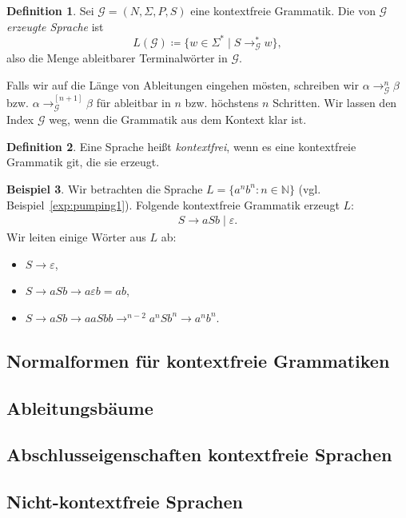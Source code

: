 \documentclass[11pt, a4paper]{article}
\theoremstyle{definition}
\newtheorem{definition}{Definition}[section]
\newtheorem{example}[definition]{Beispiel}
\theoremstyle{plain}
\numberwithin{equation}{section}
\begin{document}
\begin{definition}
	Sei $\mathcal{G} = (N, \Sigma, P, S)$ eine kontextfreie Grammatik. Die von $\mathcal{G}$ \textit{erzeugte Sprache} ist
	$$
		L(\mathcal{G}) \coloneqq \{w \in \Sigma^\ast \mid S \to_\mathcal{G}^\ast w\},
	$$
	also die Menge ableitbarer Terminalwörter in $\mathcal{G}$.
\end{definition}
Falls wir auf die Länge von Ableitungen eingehen mösten, schreiben wir $\alpha \to_\mathcal{G}^n \beta$ bzw. $\alpha \to_\mathcal{G}^{[n+1]} \beta$ für ableitbar in $n$ bzw. höchstens $n$ Schritten. Wir lassen den Index $\mathcal{G}$ weg, wenn die Grammatik aus dem Kontext klar ist.
\begin{definition}
	Eine Sprache heißt \textit{kontextfrei}, wenn es eine kontextfreie Grammatik git, die sie erzeugt.
\end{definition}
\begin{example}
	Wir betrachten die Sprache $L = \{a^n b^n : n \in \mathbb{N}\}$ (vgl. Beispiel~\ref{exp:pumping1}). Folgende kontextfreie Grammatik erzeugt $L$:
	\begin{align*}
		S \to aSb \mid \varepsilon.
	\end{align*}
	Wir leiten einige Wörter aus $L$ ab:
	\begin{itemize}
		\item $S \to \varepsilon$,
		\item $S \to aSb \to a \varepsilon b = ab$,
		\item $S \to aSb \to aaSbb \to^{n-2} a^nSb^n \to a^n b^n$.
	\end{itemize}
\end{example}


\subsection{Normalformen für kontextfreie Grammatiken}\label{sec:contextfree_normalforms}


\subsection{Ableitungsbäume}\label{sec:contextfree_derivationtrees}


\subsection{Abschlusseigenschaften kontextfreie Sprachen}\label{sec:contextfree_closure}


\subsection{Nicht-kontextfreie Sprachen}\label{sec:contextfree_noncontextfree}
\end{document}
